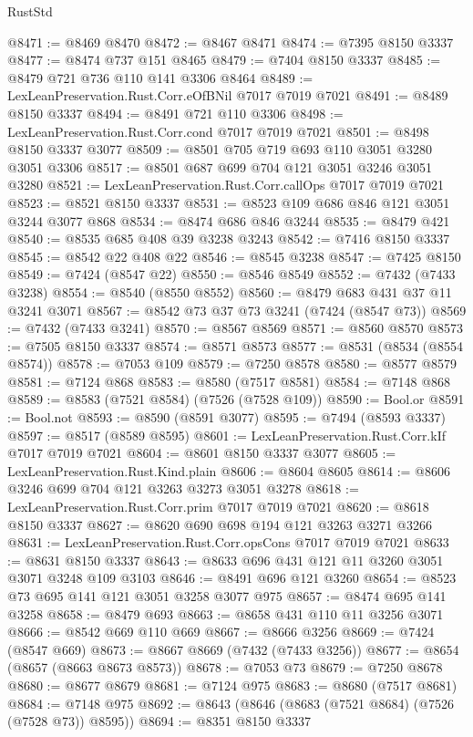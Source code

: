 \begin{lexlean}{RustStd}
\begin{coremodule}
{\begin{coremodule}
{{{{{{{{{{{{{{{{{{{{{{{{{{{{{{{{@8471 := @8469 @8470
@8472 := @8467 @8471
@8474 := @7395 @8150 @3337
@8477 := @8474 @737 @151 @8465
@8479 := @7404 @8150 @3337
@8485 := @8479 @721 @736 @110 @141 @3306 @8464
@8489 := LexLeanPreservation.Rust.Corr.eOfBNil @7017 @7019 @7021
@8491 := @8489 @8150 @3337
@8494 := @8491 @721 @110 @3306
@8498 := LexLeanPreservation.Rust.Corr.cond @7017 @7019 @7021
@8501 := @8498 @8150 @3337 @3077
@8509 := @8501 @705 @719 @693 @110 @3051 @3280 @3051 @3306
@8517 := @8501 @687 @699 @704 @121 @3051 @3246 @3051 @3280
@8521 := LexLeanPreservation.Rust.Corr.callOps @7017 @7019 @7021
@8523 := @8521 @8150 @3337
@8531 := @8523 @109 @686 @846 @121 @3051 @3244 @3077 @868
@8534 := @8474 @686 @846 @3244
@8535 := @8479 @421
@8540 := @8535 @685 @408 @39 @3238 @3243
@8542 := @7416 @8150 @3337
@8545 := @8542 @22 @408 @22
@8546 := @8545 @3238
@8547 := @7425 @8150
@8549 := @7424 (@8547 @22)
@8550 := @8546 @8549
@8552 := @7432 (@7433 @3238)
@8554 := @8540 (@8550 @8552)
@8560 := @8479 @683 @431 @37 @11 @3241 @3071
@8567 := @8542 @73 @37 @73 @3241 (@7424 (@8547 @73))
@8569 := @7432 (@7433 @3241)
@8570 := @8567 @8569
@8571 := @8560 @8570
@8573 := @7505 @8150 @3337
@8574 := @8571 @8573
@8577 := @8531 (@8534 (@8554 @8574))
@8578 := @7053 @109
@8579 := @7250 @8578
@8580 := @8577 @8579
@8581 := @7124 @868
@8583 := @8580 (@7517 @8581)
@8584 := @7148 @868
@8589 := @8583 (@7521 @8584) (@7526 (@7528 @109))
@8590 := Bool.or
@8591 := Bool.not
@8593 := @8590 (@8591 @3077)
@8595 := @7494 (@8593 @3337)
@8597 := @8517 (@8589 @8595)
@8601 := LexLeanPreservation.Rust.Corr.kIf @7017 @7019 @7021
@8604 := @8601 @8150 @3337 @3077
@8605 := LexLeanPreservation.Rust.Kind.plain
@8606 := @8604 @8605
@8614 := @8606 @3246 @699 @704 @121 @3263 @3273 @3051 @3278
@8618 := LexLeanPreservation.Rust.Corr.prim @7017 @7019 @7021
@8620 := @8618 @8150 @3337
@8627 := @8620 @690 @698 @194 @121 @3263 @3271 @3266
@8631 := LexLeanPreservation.Rust.Corr.opsCons @7017 @7019 @7021
@8633 := @8631 @8150 @3337
@8643 := @8633 @696 @431 @121 @11 @3260 @3051 @3071 @3248 @109 @3103
@8646 := @8491 @696 @121 @3260
@8654 := @8523 @73 @695 @141 @121 @3051 @3258 @3077 @975
@8657 := @8474 @695 @141 @3258
@8658 := @8479 @693
@8663 := @8658 @431 @110 @11 @3256 @3071
@8666 := @8542 @669 @110 @669
@8667 := @8666 @3256
@8669 := @7424 (@8547 @669)
@8673 := @8667 @8669 (@7432 (@7433 @3256))
@8677 := @8654 (@8657 (@8663 @8673 @8573))
@8678 := @7053 @73
@8679 := @7250 @8678
@8680 := @8677 @8679
@8681 := @7124 @975
@8683 := @8680 (@7517 @8681)
@8684 := @7148 @975
@8692 := @8643 (@8646 (@8683 (@7521 @8684) (@7526 (@7528 @73)) @8595))
@8694 := @8351 @8150 @3337
}}}}}}}}}}}}}}}}}}}}}}}}}}}}}}}}
\end{coremodule}}
\end{coremodule}
\end{lexlean}
